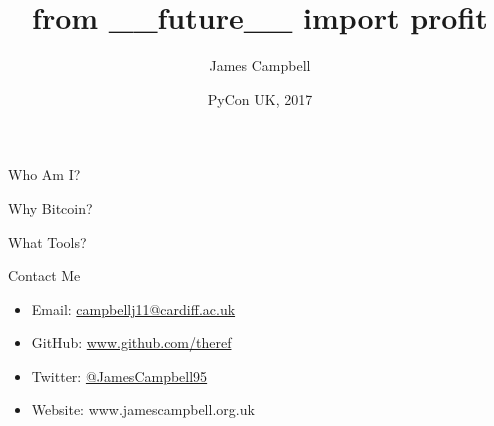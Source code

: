 \documentclass{beamer}
\title{from \_\_future\_\_ import profit}
\author{James Campbell}
\institute[Cardiff University]
  {
  Department of Mathematics\\
  Cardiff University
  }
\date{PyCon UK, 2017}
\begin{document}
\begin{frame}
  \titlepage
\end{frame}

\begin{frame}{Who Am I?}
\end{frame}

\begin{frame}{Why Bitcoin?}
\end{frame}

\begin{frame}{What Tools?}
\end{frame}

\begin{frame}{Contact Me}
  \begin{itemize}
    \itemsep2em
    \item Email: \href{mailto:campbellj11@cardiff.ac.uk}{campbellj11@cardiff.ac.uk}

    \item GitHub: \href{https://github.com/theref}{www.github.com/theref}

    \item Twitter: \href{https://twitter.com/JamesCampbell95}{@JamesCampbell95}

    \item Website: www.jamescampbell.org.uk
  \end{itemize}
\end{frame}
\end{document}
